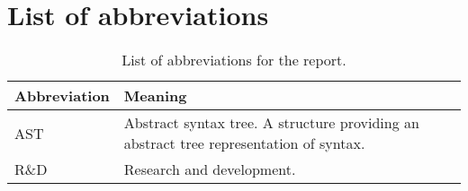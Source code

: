 \section{List of abbreviations}
\begin{table}[H]
    \centering
    \begin{tabular}{|p{}|p{}|}
    \hline
    \rowcolor{gray!30}
    \textbf{Abbreviation} & \textbf{Meaning} \\ \hline
    AST & Abstract syntax tree. A structure providing an abstract tree representation of syntax. \\ \hline
    R\&D & Research and development. \\ \hline
    \end{tabular}
    \caption{List of abbreviations for the report.}
    \label{tab:02abb:listAbbreviations}
\end{table}
